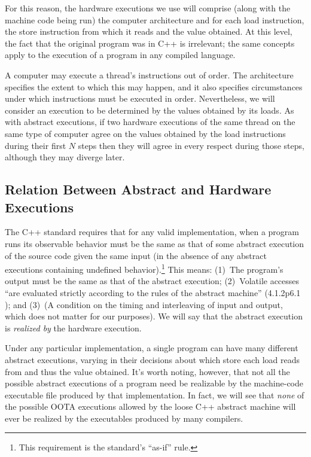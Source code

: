 For this reason, the hardware executions we use will comprise (along
with the machine code being run) the computer architecture and for each
load instruction, the store instruction from which it reads and the
value obtained.
At this level, the fact that the original program was in C++ is
irrelevant; the same concepts apply to the execution of a program in
any compiled language.

A computer may execute a thread's instructions out of order.
The architecture specifies the extent to which this may happen, and it
also specifies circumstances under which instructions
must be executed in order.
Nevertheless, we will consider an execution to be determined by the
values obtained by its loads.
As with abstract executions, if two hardware executions of the same
thread on the same type of computer agree on the values obtained by
the load instructions during their first $N$ steps then they will
agree in every respect during those steps, although they may diverge
later.

\subsection{Relation Between Abstract and Hardware Executions}
\label{sec:Relation Between Abstract and Hardware Executions}

The C++ standard requires that for any valid implementation, when a
program runs its observable behavior must be the same as that of some
abstract execution of the source code given the same input (in the
absence of any abstract executions containing undefined behavior).\footnote{
	This requirement is the standard's ``as-if'' rule.}
This means:
(1)~The program's output must be the same as that of the abstract execution;
(2)~Volatile accesses ``are evaluated strictly according to the
rules of the abstract machine'' (4.1.2p6.1 ); and
(3)~(A condition on the timing and interleaving of input and output,
which does not matter for our purposes).
We will say that the abstract execution is \emph{realized by} the
hardware execution.

Under any particular implementation,
a single program can have many different abstract executions,
varying in their decisions about which store each load reads from
and thus the value obtained.
It's worth noting, however, that not all the possible abstract executions
of a program need be realizable by the machine-code executable file
produced by that implementation.
In fact, we will see that \emph{none} of the possible OOTA executions
allowed by the loose C++ abstract machine will ever be realized
by the executables produced by many compilers.

